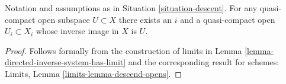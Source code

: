 \begin{lemma}
\label{lemma-descend-opens}
Notation and assumptions as in Situation \ref{situation-descent}.
For any quasi-compact open subspace $U \subset X$ there exists an $i$
and a quasi-compact open $U_i \subset X_i$ whose inverse image in $X$ is $U$.
\end{lemma}

\begin{proof}
Follows formally from the construction of limits in
Lemma \ref{lemma-directed-inverse-system-has-limit}
and the corresponding result for schemes:
Limits, Lemma \ref{limits-lemma-descend-opens}.
\end{proof}
